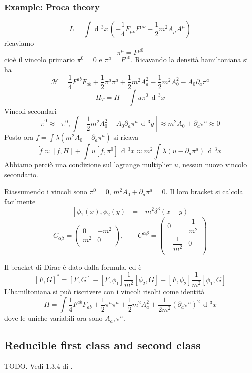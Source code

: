 \documentclass[a4paper, 11pt]{article}
\newcommand{\dd}{\mathop{\mathrm{d}\!}{}}
\begin{document}
	\subsubsection{Example: Proca theory}
	\[ L = \int \dd^3 x\, \left(-\dfrac{1}{4} F_{\mu\nu}F^{\mu\nu} - \dfrac{1}{2} m^2 A_\mu A^\mu \right) \]
	ricaviamo
	\[ \pi^\mu = F^{\mu 0} \]
	cioè il vincolo primario $\pi^0=0$ e $\pi^a = F^{a0}$. Ricavando la densità hamiltoniana si ha
	\[ \mathcal{H} = \dfrac{1}{4} F^{ab}F_{ab} + \dfrac{1}{2} \pi^a\pi^a + \dfrac{1}{2} m^2 A_a^2 - \dfrac{1}{2} m^2 A_0^2 - A_0 \partial_a \pi^a \]
	\[ H_T = H + \int u\pi^0\,\dd^3 x \]
	Vincoli secondari
	\[ \dot{\pi}^0 \approx \left[ \pi^0, \int -\dfrac{1}{2} m^2 A_0^2 - A_0 \partial_a \pi^a\,\dd^3 y \right] \approx m^2 A_0 + \partial_a \pi^a \approx 0 \]
	Posto ora $f = \int \lambda \left( m^2 A_0 + \partial_a \pi^a \right)$ si ricava
	\[ \dot{f} \approx [f,H] + \int u [f,\pi^0]\,\dd^3 x \approx m^2 \int \lambda \left(u-\partial_a\pi^a\right)\,\dd^3 x \]
	Abbiamo perciò una condizione sul lagrange multiplier $u$, nessun nuovo vincolo secondario.
	
	Riassumendo i vincoli sono $\pi^0 = 0$, $m^2A_0 + \partial_a \pi^a = 0$. Il loro bracket si calcola facilmente
	\[ [\phi_1(x), \phi_2(y)] = -m^2 \delta^3(x-y) \]
	\[ C_{\alpha\beta} = \begin{pmatrix}
	0 & -m^2 \\
	m^2 & 0 \\
	\end{pmatrix},\qquad
	C^{\alpha\beta} = \begin{pmatrix}
	0 & \dfrac{1}{m^2} \\
	-\dfrac{1}{m^2} & 0 \\
	\end{pmatrix} \]
	
	Il bracket di Dirac è dato dalla formula, ed è
	\[ [F,G]^* = [F,G] - [F,\phi_1]\dfrac{1}{m^2}[\phi_2,G] + [F,\phi_2]\dfrac{1}{m^2}[\phi_1,G] \]
	L'hamiltoniana si può riscrivere con i vincoli risolti come identità
	\[ H = \int \dfrac{1}{4} F^{ab}F_{ab} + \dfrac{1}{2} \pi^a\pi^a + \dfrac{1}{2} m^2 A_a^2 + \dfrac{1}{2m^2} (\partial_a \pi^a)^2\,\dd^3 x \]
	dove le uniche variabili ora sono $A_a,\pi^a$.
	
	\subsection{Reducible first class and second class}
	TODO. Vedi 1.3.4 di \cite{HT}.
	
\end{document}
